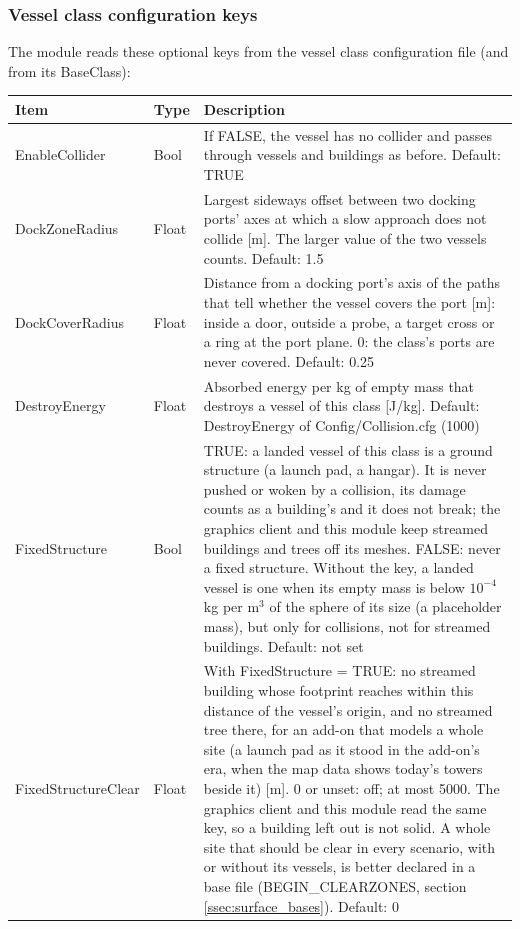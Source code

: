 \documentclass[Orbiter Developer Manual.tex]{subfiles}
\begin{document}
\begin{sloppypar}
\subsubsection{Vessel class configuration keys}
The module reads these optional keys from the vessel class configuration file (and from its BaseClass):

	\begin{longtable}{ |p{}|p{}|p{}| }
	\hline\rule{0pt}{2ex}
	\textbf{Item} & \textbf{Type} & \textbf{Description}\\
	\hline\rule{0pt}{2ex}
	EnableCollider & Bool & If FALSE, the vessel has no collider and passes through vessels and buildings as before. Default: TRUE\\
	\hline\rule{0pt}{2ex}
	DockZoneRadius & Float & Largest sideways offset between two docking ports' axes at which a slow approach does not collide [m]. The larger value of the two vessels counts. Default: 1.5\\
	\hline\rule{0pt}{2ex}
	DockCoverRadius & Float & Distance from a docking port's axis of the paths that tell whether the vessel covers the port [m]: inside a door, outside a probe, a target cross or a ring at the port plane. 0: the class's ports are never covered. Default: 0.25\\
	\hline\rule{0pt}{2ex}
	DestroyEnergy & Float & Absorbed energy per kg of empty mass that destroys a vessel of this class [J/kg]. Default: DestroyEnergy of Config/Collision.cfg (1000)\\
	\hline\rule{0pt}{2ex}
	FixedStructure & Bool & TRUE: a landed vessel of this class is a ground structure (a launch pad, a hangar). It is never pushed or woken by a collision, its damage counts as a building's and it does not break; the graphics client and this module keep streamed buildings and trees off its meshes. FALSE: never a fixed structure. Without the key, a landed vessel is one when its empty mass is below $10^{-4}$ kg per m$^3$ of the sphere of its size (a placeholder mass), but only for collisions, not for streamed buildings. Default: not set\\
	\hline\rule{0pt}{2ex}
	FixedStructureClear & Float & With FixedStructure = TRUE: no streamed building whose footprint reaches within this distance of the vessel's origin, and no streamed tree there, for an add-on that models a whole site (a launch pad as it stood in the add-on's era, when the map data shows today's towers beside it) [m]. 0 or unset: off; at most 5000. The graphics client and this module read the same key, so a building left out is not solid. A whole site that should be clear in every scenario, with or without its vessels, is better declared in a base file (BEGIN\_CLEARZONES, section \ref{ssec:surface_bases}). Default: 0\\
	\hline
	\end{longtable}



\end{sloppypar}
\end{document}
